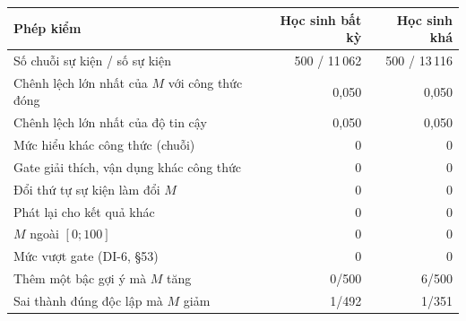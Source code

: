 \small
\begin{tabular}{@{}>{\raggedright\arraybackslash}p{3.4cm}rr@{}}
\toprule
Phép kiểm & Học sinh bất kỳ & Học sinh khá \\
\midrule
Số chuỗi sự kiện / số sự kiện & 500 / 11\,062 & 500 / 13\,116 \\
\midrule
Chênh lệch lớn nhất của $M$ với công thức đóng & 0,050 & 0,050 \\
Chênh lệch lớn nhất của độ tin cậy & 0,050 & 0,050 \\
\midrule
Mức hiểu khác công thức (chuỗi) & 0 & 0 \\
Gate giải thích, vận dụng khác công thức & 0 & 0 \\
\midrule
Đổi thứ tự sự kiện làm đổi $M$ & 0 & 0 \\
Phát lại cho kết quả khác & 0 & 0 \\
$M$ ngoài $[0;100]$ & 0 & 0 \\
\midrule
Mức vượt gate (DI-6, §53) & 0 & 0 \\
Thêm một bậc gợi ý mà $M$ tăng & 0/500 & 6/500 \\
Sai thành đúng độc lập mà $M$ giảm & 1/492 & 1/351 \\
\bottomrule
\end{tabular}
